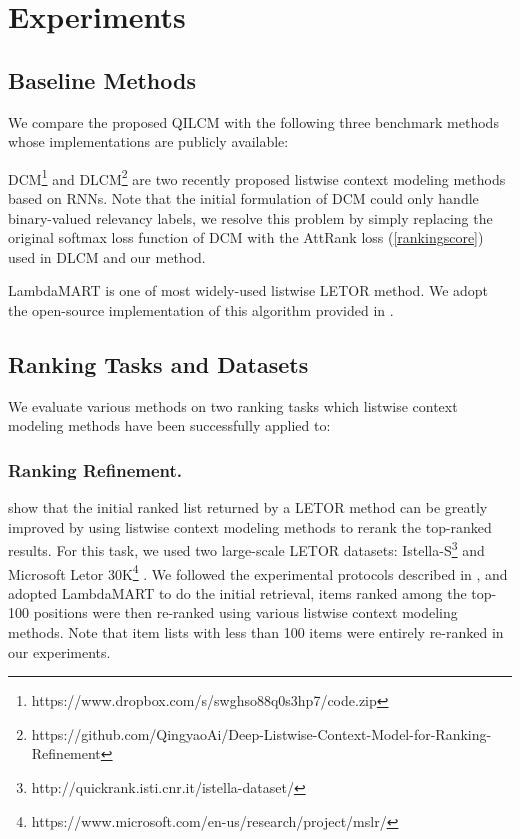 \documentclass[letterpaper]{article} %
\begin{document}
\section{Experiments}

\subsection{Baseline Methods}

We compare the proposed QILCM with the following three benchmark methods whose implementations are publicly available:

DCM\footnote{https://www.dropbox.com/s/swghso88q0s3hp7/code.zip} \cite{DCM} and  DLCM\footnote{https://github.com/QingyaoAi/Deep-Listwise-Context-Model-for-Ranking-Refinement} \cite{ai2018learning} are two recently proposed listwise context modeling methods based on RNNs. Note that the initial formulation of DCM could only handle binary-valued relevancy labels, we resolve this problem by simply replacing the original softmax loss function of DCM with the AttRank loss (\ref{rankingscore}) used in DLCM and our method.

LambdaMART \cite{000278621400005} is one of most widely-used listwise LETOR method. We adopt the open-source implementation of this algorithm provided in \cite{capannini2016quality}.

\subsection{Ranking Tasks and Datasets}

We evaluate various methods on two ranking tasks which listwise context modeling methods have been successfully applied to:
\subsubsection{Ranking Refinement.} \cite{ai2018learning} show that the initial ranked list returned by a LETOR method can be greatly improved by using listwise context modeling methods to rerank the top-ranked results. For this task, we used two large-scale LETOR datasets: Istella-S\footnote{http://quickrank.isti.cnr.it/istella-dataset/} \cite{istella} and Microsoft Letor 30K\footnote{https://www.microsoft.com/en-us/research/project/mslr/} \cite{qin2013introducing}. We followed the experimental protocols described in \cite{ai2018learning}, and adopted LambdaMART to do the initial retrieval, items ranked among the top-100 positions were then re-ranked using various listwise context modeling methods. Note that item lists with less than 100 items were entirely re-ranked in our experiments.
\end{document}

